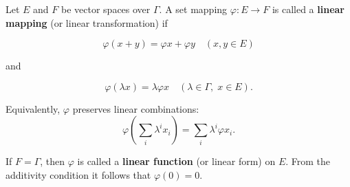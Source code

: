 Let $E$ and $F$ be vector spaces over $\Gamma$. A set mapping $\varphi: E \to F$ is called a \textbf{linear mapping} (or linear transformation) if

$$\varphi(x + y) = \varphi x + \varphi y \quad (x, y \in E)$$

and

$$\varphi(\lambda x) = \lambda \varphi x \quad (\lambda \in \Gamma, \; x \in E).$$

Equivalently, $\varphi$ preserves linear combinations:
$$\varphi\left(\sum_i \lambda^i x_i\right) = \sum_i \lambda^i \varphi x_i.$$

If $F = \Gamma$, then $\varphi$ is called a \textbf{linear function} (or linear form) on $E$. From the additivity condition it follows that $\varphi(0) = 0$.
